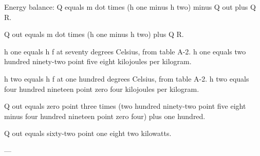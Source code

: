 Energy balance:  
Q equals m dot times (h one minus h two) minus Q out plus Q R.  

Q out equals m dot times (h one minus h two) plus Q R.  

h one equals h f at seventy degrees Celsius, from table A-2.  
h one equals two hundred ninety-two point five eight kilojoules per kilogram.  

h two equals h f at one hundred degrees Celsius, from table A-2.  
h two equals four hundred nineteen point zero four kilojoules per kilogram.  

Q out equals zero point three times (two hundred ninety-two point five eight minus four hundred nineteen point zero four) plus one hundred.  

Q out equals sixty-two point one eight two kilowatts.  

---